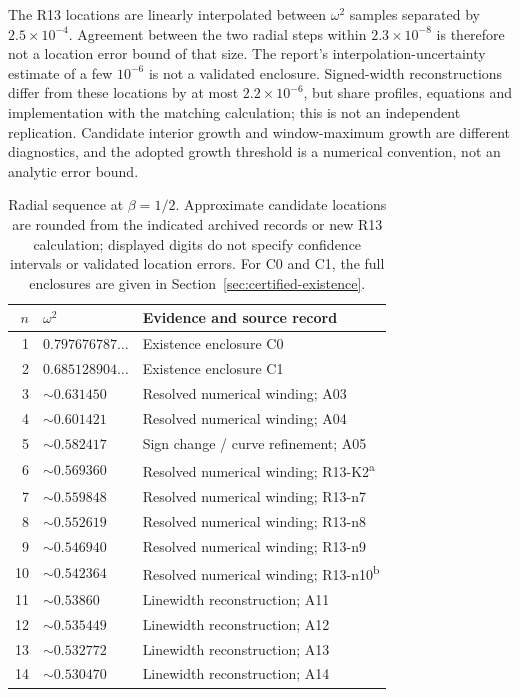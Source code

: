 \documentclass[a4paper,11pt]{article}
\begin{document}
The R13 locations are linearly interpolated between $\omega^2$ samples
separated by $2.5\times10^{-4}$. Agreement between the two radial steps
within $2.3\times10^{-8}$ is therefore not a location error bound of that
size. The report's interpolation-uncertainty estimate of a few $10^{-6}$
is not a validated enclosure. Signed-width reconstructions differ from
these locations by at most $2.2\times10^{-6}$, but share profiles,
equations and implementation with the matching calculation; this is not
an independent replication. Candidate interior growth and window-maximum
growth are different diagnostics, and the adopted growth threshold is
a numerical convention, not an analytic error bound.
\begin{table}[htbp]\centering\small
\caption{Radial sequence at $\beta=1/2$. Approximate candidate locations
are rounded from the indicated archived records or new R13 calculation;
displayed digits
do not specify confidence intervals or validated location errors.
For C0 and C1, the full enclosures are given in
Section~\ref{sec:certified-existence}.}
\label{tab:ladder}
\begin{tabular}{rll}\toprule
$n$&$\omega^2$&Evidence and source record\\\midrule
1&$0.797676787\ldots$&Existence enclosure C0\\
2&$0.685128904\ldots$&Existence enclosure C1\\
3&$\sim0.631450$&Resolved numerical winding; A03\\
4&$\sim0.601421$&Resolved numerical winding; A04\\
5&$\sim0.582417$&Sign change / curve refinement; A05\\
6&$\sim0.569360$&Resolved numerical winding; R13-K2\textsuperscript{a}\\
7&$\sim0.559848$&Resolved numerical winding; R13-n7\\
8&$\sim0.552619$&Resolved numerical winding; R13-n8\\
9&$\sim0.546940$&Resolved numerical winding; R13-n9\\
10&$\sim0.542364$&Resolved numerical winding; R13-n10\textsuperscript{b}\\
11&$\sim0.53860$&Linewidth reconstruction; A11\\
12&$\sim0.535449$&Linewidth reconstruction; A12\\
13&$\sim0.532772$&Linewidth reconstruction; A13\\
14&$\sim0.530470$&Linewidth reconstruction; A14\\

\end{tabular}
\end{table}
\end{document}
